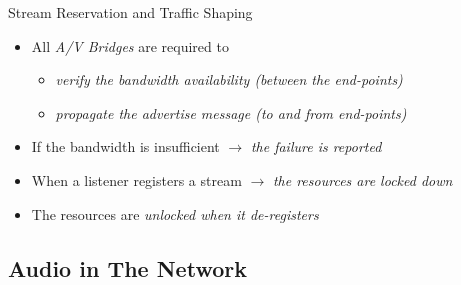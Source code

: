 \documentclass{beamer}
\begin{document}
\begin{frame}[allowframebreaks]{ Stream Reservation and Traffic Shaping }
\break

\begin{itemize}
	\item All \emph{A/V Bridges} are required to

	\begin{itemize}
		\item \emph{verify the bandwidth availability (between the end-points)}
		\item \emph{propagate the advertise message (to and from end-points)}
	\end{itemize}

	\item If the bandwidth is insufficient \newline
		$\rightarrow$ \emph{the failure is reported}
	\item When a listener registers a stream \newline
		$\rightarrow$ \emph{the resources are locked down}
	\item The resources are \emph{unlocked when it de-registers}

\end{itemize}

\end{frame}


\subsection{Audio in The Network}
\end{document}
